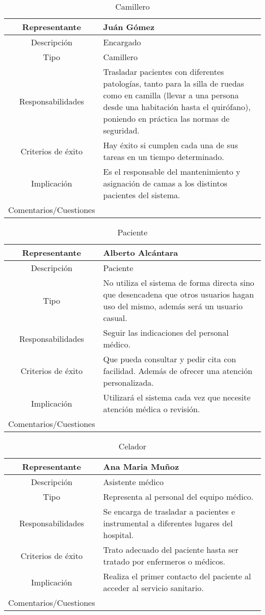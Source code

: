 \documentclass[12pt, spanish]{article}
\begin{document}
\begin{longtable}{|c|p{.65\linewidth}|}
   \caption{Camillero} \\
   \hline
   Representante & Juán Gómez\\
   \hline
   Descripción & Encargado \\
   \hline
   Tipo & Camillero \\
   \hline
   Responsabilidades & Trasladar pacientes con diferentes patologías, tanto para la silla de ruedas como en camilla (llevar a una persona desde una habitación hasta el quirófano), poniendo en práctica las normas de seguridad. \\
   \hline
   Criterios de éxito & Hay éxito si cumplen cada una de sus tareas en un tiempo determinado. \\
   \hline
   Implicación & Es el responsable del mantenimiento y asignación de camas a los distintos pacientes del sistema. \\
   \hline
   Comentarios/Cuestiones & \\
   \hline
\end{longtable}


\begin{longtable}{|c|p{.65\linewidth}|}
   \caption{Paciente} \\
   \hline
   Representante & Alberto Alcántara\\
   \hline
   Descripción & Paciente \\
   \hline
   Tipo & No utiliza el sistema de forma directa sino que desencadena que otros usuarios hagan uso del mismo, además será un usuario casual. \\
   \hline
   Responsabilidades & Seguir las indicaciones del personal médico.  \\
   \hline
   Criterios de éxito & Que pueda consultar y pedir cita con facilidad. Además de ofrecer una atención personalizada. \\
   \hline
   Implicación & Utilizará el sistema cada vez que necesite atención médica o revisión. \\
   \hline
   Comentarios/Cuestiones & \\
   \hline
\end{longtable}


\begin{longtable}{|c|p{.65\linewidth}|}
   \caption{Celador} \\
   \hline
   Representante & Ana Maria Muñoz\\
   \hline
   Descripción & Asistente médico \\
   \hline
   Tipo & Representa al personal del equipo médico.  \\
   \hline
   Responsabilidades & Se encarga de trasladar a pacientes e instrumental a diferentes lugares del hospital.  \\
   \hline
   Criterios de éxito & Trato adecuado del paciente hasta ser tratado por enfermeros o médicos. \\
   \hline
   Implicación & Realiza el primer contacto del paciente al acceder al servicio sanitario. \\
   \hline
   Comentarios/Cuestiones & \\
   \hline
\end{longtable}
\end{document}
